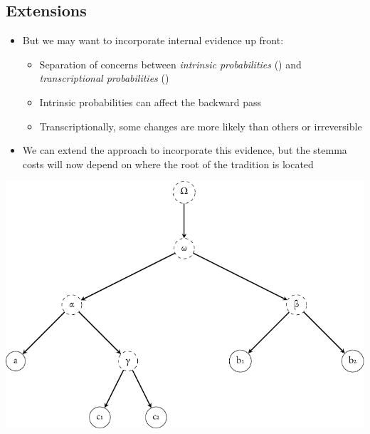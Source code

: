 \documentclass[10pt]{beamer}
\begin{document}
	\subsection{Extensions}
	\begin{frame}
		\begin{itemize}
			\item But we may want to incorporate internal evidence up front:
			\begin{itemize}
				\item Separation of concerns between \emph{intrinsic probabilities} () and \emph{transcriptional probabilities} ()
				\item Intrinsic probabilities can affect the backward pass
				\item Transcriptionally, some changes are more likely than others or irreversible
			\end{itemize}
			\item We can extend the approach to incorporate this evidence, but the stemma costs will now depend on where the root of the tradition is located
		\end{itemize}
		\begin{center}
			\includegraphics[scale=0.5]{../img/gene-tree-rooted-site-1.pdf}
		\end{center}
	\end{frame}
\end{document}
